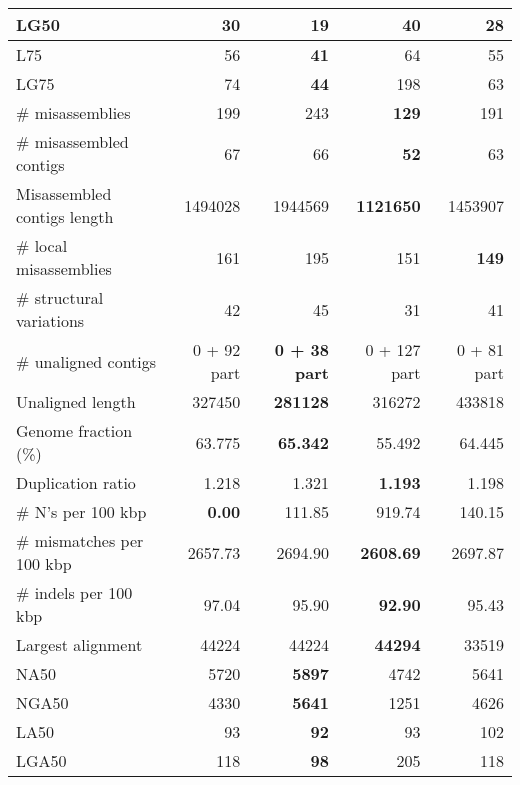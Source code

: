 \documentclass[12pt,a4paper]{article}
\begin{document}
\begin{table}[ht]
\begin{center}
\begin{tabular}{|l*{4}{|r}|}
LG50 & 30 & {\bf 19} & 40 & 28 \\ \hline
L75 & 56 & {\bf 41} & 64 & 55 \\ \hline
LG75 & 74 & {\bf 44} & 198 & 63 \\ \hline
\# misassemblies & 199 & 243 & {\bf 129} & 191 \\ \hline
\# misassembled contigs & 67 & 66 & {\bf 52} & 63 \\ \hline
Misassembled contigs length & 1494028 & 1944569 & {\bf 1121650} & 1453907 \\ \hline
\# local misassemblies & 161 & 195 & 151 & {\bf 149} \\ \hline
\# structural variations & 42 & 45 & 31 & 41 \\ \hline
\# unaligned contigs & 0 + 92 part & {\bf 0 + 38 part} & 0 + 127 part & 0 + 81 part \\ \hline
Unaligned length & 327450 & {\bf 281128} & 316272 & 433818 \\ \hline
Genome fraction (\%) & 63.775 & {\bf 65.342} & 55.492 & 64.445 \\ \hline
Duplication ratio & 1.218 & 1.321 & {\bf 1.193} & 1.198 \\ \hline
\# N's per 100 kbp & {\bf 0.00} & 111.85 & 919.74 & 140.15 \\ \hline
\# mismatches per 100 kbp & 2657.73 & 2694.90 & {\bf 2608.69} & 2697.87 \\ \hline
\# indels per 100 kbp & 97.04 & 95.90 & {\bf 92.90} & 95.43 \\ \hline
Largest alignment & 44224 & 44224 & {\bf 44294} & 33519 \\ \hline
NA50 & 5720 & {\bf 5897} & 4742 & 5641 \\ \hline
NGA50 & 4330 & {\bf 5641} & 1251 & 4626 \\ \hline
LA50 & 93 & {\bf 92} & 93 & 102 \\ \hline
LGA50 & 118 & {\bf 98} & 205 & 118 \\ \hline
\end{tabular}
\end{center}
\end{table}
\end{document}
